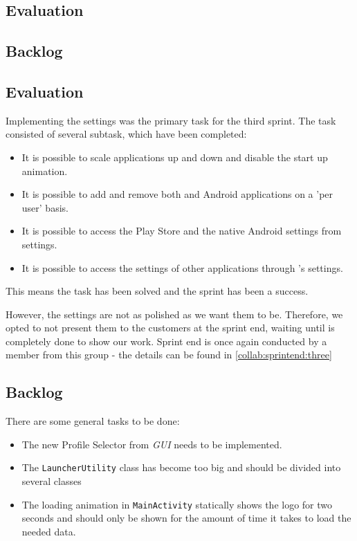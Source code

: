 \subsection{Evaluation}

\subsection{Backlog}




\subsection{Evaluation}
Implementing the settings was the primary task for the third sprint.
The task consisted of several subtask, which have been completed:

\begin{itemize}
\item It is possible to scale applications up and down and disable the start up animation.
\item It is possible to add and remove both \giraf and Android applications on a 'per user' basis.
\item It is possible to access the Play Store and the native Android settings from settings.
\item It is possible to access the settings of other \giraf applications through \launcher 's settings.
\end{itemize}

This means the task has been solved and the sprint has been a success. 

However, the settings are not as polished as we want them to be.
Therefore, we opted to not present them to the customers at the sprint end, waiting until \launcher is completely done to show our work.
Sprint end is once again conducted by a member from this group - the details can be found in \cref{collab:sprintend:three}

\subsection{Backlog}

There are some general tasks to be done:

\begin{itemize}
\item The new Profile Selector from \textit{GUI} needs to be implemented.
\item The \lstinline!LauncherUtility! class has become too big and should be divided into several classes 
\item The loading animation in \lstinline!MainActivity! statically shows the logo for two seconds and should only be shown for the amount of time it takes to load the needed data.
\end{itemize}

